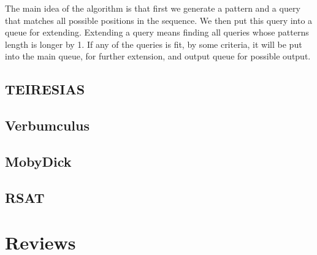 The main idea of the algorithm is that first we generate a 
pattern and a query that matches all possible positions in 
the sequence. We then put this query into a queue for extending.
Extending a query means finding all queries whose patterns length
is longer by 1. If any of the queries is fit, by some criteria,
it will be put into the main queue, for further extension, 
and output queue for possible output.

\subsection{TEIRESIAS}

 \cite{TEIRESIAS}

\subsection{Verbumculus}

 \cite{Verbumculus}

\subsection{MobyDick}

 \cite{MobyDick}

\subsection{RSAT}

 \cite{RSAT}

\section{Reviews}

